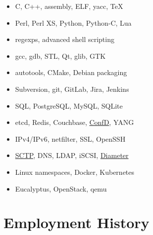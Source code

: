 \documentclass[a4paper,12pt]{article}
\newcommand{\compress}{\setlength\itemsep{-\parskip}}
\newenvironment{compressedItemize}{\begin{itemize}\compress}{\end{itemize}}
\begin{document}
\begin{multicols}{2}
\begin{compressedItemize}
\item	C, C++, assembly, ELF, yacc, \TeX
\item	Perl, Perl XS, Python, Python-C, Lua
\item	regexps, advanced shell scripting
\item	gcc, gdb, STL, Qt, glib, GTK
\item	autotools, CMake, Debian packaging
\item	Subversion, git, GitLab, Jira, Jenkins
\columnbreak
\item	SQL, PostgreSQL, MySQL, SQLite
\item	etcd, Redis, Couchbase,
	\href{https://www.tail-f.com/confd-basic}{ConfD}, YANG
\item	IPv4/IPv6, netfilter, SSL, OpenSSH
\item	\href{https://en.wikipedia.org/wiki/SCTP}{SCTP}, DNS, LDAP,
	iSCSI, \href{https://tools.ietf.org/html/rfc6733}{Diameter}
\item	Linux namespaces, Docker, Kubernetes
\item	Eucalyptus, OpenStack, qemu
\end{compressedItemize}
\end{multicols}

\section{Employment History}
\end{document}
